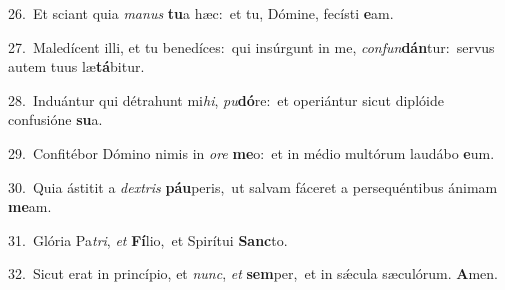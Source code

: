 {\numbfont\textcolor{\numbcolor}{26.}}~Et sciant quia \textit{ma}\-\textit{nus} \textbf{tu}\-a hæc:~\star et tu, Dómine, fecísti \textbf{e}\-am.\par
{\numbfont\textcolor{\numbcolor}{27.}}~Maledícent illi, et tu benedíces:~\dagger qui insúrgunt in me, \textit{con}\-\textit{fun}\textbf{dán}tur:~\star servus autem tuus læ\-\textbf{tá}\-bitur.\par
{\numbfont\textcolor{\numbcolor}{28.}}~Induántur qui détrahunt mi\-\textit{hi}\-, \textit{pu}\-\textbf{dó}re:~\star et operiántur sicut diplóide confusióne \textbf{su}\-a.\par
{\numbfont\textcolor{\numbcolor}{29.}}~Confitébor Dómino nimis in \textit{o}\-\textit{re} \textbf{me}\-o:~\star et in médio multórum laudábo \textbf{e}\-um.\par
{\numbfont\textcolor{\numbcolor}{30.}}~Quia ástitit a \textit{dex}\-\textit{tris} \textbf{páu}\-peris,~\star ut salvam fáceret a persequéntibus ánimam \textbf{me}\-am.\par
{\numbfont\textcolor{\numbcolor}{31.}}~Glória Pa\-\textit{tri}\-, \textit{et} \textbf{Fí}\-lio,~\star et Spirítui \textbf{Sanc}\-to.\par
{\numbfont\textcolor{\numbcolor}{32.}}~Sicut erat in princípio, et \textit{nunc}\-, \textit{et} \textbf{sem}\-per,~\star et in sǽcula sæculórum. \textbf{A}\-men.\par

